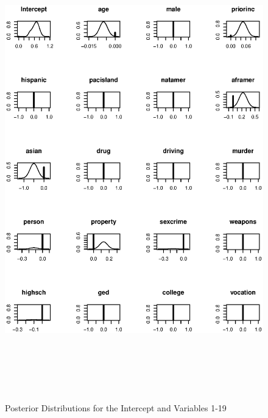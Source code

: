 \begin{figure}[t]
\begin{center}
\includegraphics[height=20cm,width=14.5cm]{graphapp031.eps}
\caption{Posterior Distributions for the Intercept and Variables 1-19}
\end{center}
\end{figure}

